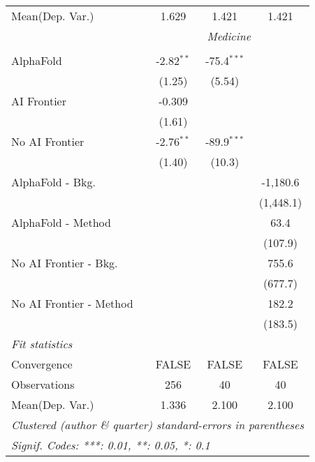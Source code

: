 \begin{tabular}{lccc}
Mean(Dep. Var.) & 1.629 & 1.421 & 1.421 \\
 & \multicolumn{3}{c}{\textit{Medicine}} \\ \\
   AlphaFold               & -2.82$^{**}$ & -75.4$^{***}$ &   \\   
                           & (1.25)       & (5.54)        &   \\   
   AI Frontier             & -0.309       &               &   \\   
                           & (1.61)       &               &   \\   
   No AI Frontier          & -2.76$^{**}$ & -89.9$^{***}$ &   \\   
                           & (1.40)       & (10.3)        &   \\   
   AlphaFold - Bkg.        &              &               & -1,180.6\\   
                           &              &               & (1,448.1)\\   
   AlphaFold - Method      &              &               & 63.4\\   
                           &              &               & (107.9)\\   
   No AI Frontier - Bkg.   &              &               & 755.6\\   
                           &              &               & (677.7)\\   
   No AI Frontier - Method &              &               & 182.2\\   
                           &              &               & (183.5)\\   
   \midrule
   \emph{Fit statistics}\\
   Convergence             &FALSE         & FALSE         & FALSE\\  
   Observations            & 256          & 40            & 40\\  
Mean(Dep. Var.) & 1.336 & 2.100 & 2.100 \\
   \midrule \midrule
   \multicolumn{4}{l}{\emph{Clustered (author \& quarter) standard-errors in parentheses}}\\
   \multicolumn{4}{l}{\emph{Signif. Codes: ***: 0.01, **: 0.05, *: 0.1}}\\
\end{tabular}
\par\endgroup
